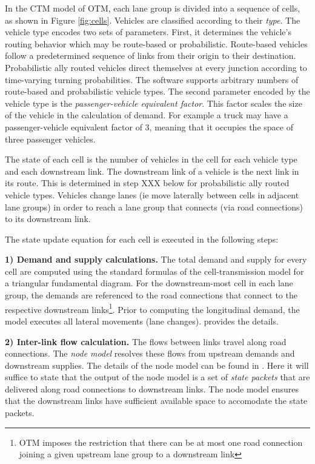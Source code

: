 In the CTM model of OTM, each lane group is divided into a sequence of cells, as shown in Figure \ref{fig:cells}. Vehicles are classified according to their \textit{type}. The vehicle type encodes two sets of parameters. First, it determines the vehicle's routing behavior which may be route-based or probabilistic. Route-based vehicles follow a predetermined sequence of links from their origin to their destination. Probabilistic ally routed vehicles direct themselves at every junction according to time-varying turning probabilities. The software supports arbitrary numbers of route-based and probabilistic vehicle types. The second parameter encoded by the vehicle type is the \textit{passenger-vehicle equivalent factor}. This factor scales the size of the vehicle in the calculation of demand. For example a truck may have a passenger-vehicle equivalent factor of 3, meaning that it occupies the space of three passenger vehicles.

The state of each cell is the number of vehicles in the cell for each vehicle type and each downstream link. The downstream link of a vehicle is the next link in its route. This is determined in step XXX below for probabilistic ally routed vehicle types. Vehicles change lanes (ie move laterally between cells in adjacent lane groups) in order to reach a lane group that connects (via road connections) to its downstream link. 

The state update equation for each cell is executed in the following steps:

\vspace{1em} \noindent \textbf{1) Demand and supply calculations.} The total demand and supply for every cell are computed using the standard formulas of the cell-transmission model for a triangular fundamental diagram. For the downstream-most cell in each lane group, the demands are referenced to the road connections that connect to the respective downstream links\footnote{OTM imposes the restriction that there can be at most one road connection joining a given upstream lane group to a downstream link}. Prior to computing the longitudinal demand, the model executes all lateral movements (lane changes). \cite{Gomes2019OpenTM} provides the details. 

\vspace{1em}\noindent \textbf{2) Inter-link flow calculation.} The flows between links travel along road connections. The \textit{node model} resolves these flows from upstream demands and downstream supplies. The details of the node model can be found in \cite{Gomes2019OpenTM}. Here it will suffice to state that the output of the node model is a set of \textit{state packets} that are delivered along road connections to downstream links. The node model ensures that the downstream links have sufficient available space to accomodate the state packets.  

